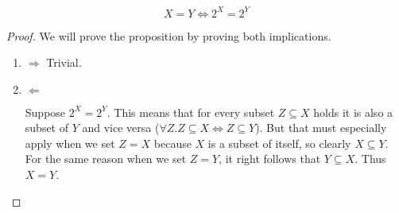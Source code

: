 \documentclass{article}
\title{}
\author{Adam Fiedler}
\begin{document}
\maketitle

\[ X = Y \iff 2^X = 2^Y \]

\begin{proof}

We will prove the proposition by proving both implications.

\begin{enumerate}

\item $\Rightarrow$ Trivial.

\item $\Leftarrow$

Suppose $2^X = 2^Y$. This means that for every subset $Z \subseteq X$ holds it is also a subset of $Y$ and vice versa ($\forall Z . Z \subseteq X \iff Z \subseteq Y$). But that must especially apply when we set $Z = X$ because $X$ is a subset of itself, so clearly $X \subseteq Y$. For the same reason when we set $Z = Y$, it right follows that $Y \subseteq X$. Thus $X = Y$.

\end{enumerate}

\end{proof}
\end{document}
